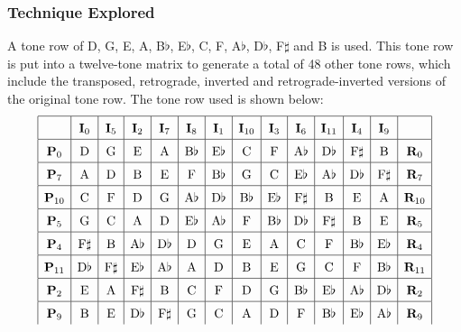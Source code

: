 \documentclass{article}
\begin{document}
\subsubsection{Technique Explored}

A tone row of D, G, E, A, B\(\flat\), E\(\flat\), C, F, A\(\flat\), D\(\flat\), F\(\sharp\) and B is used. This tone row is put into a twelve-tone matrix to generate a total of 48 other tone rows, which include the transposed, retrograde, inverted and retrograde-inverted versions of the original tone row. The tone row used is shown below:
\\
\[\def\arraystretch{1.5}
\begin{array}{|c|c|c|c|c|c|c|c|c|c|c|c|c|c|}
\hline
&\mathbf{I}_0&\mathbf{I}_5&\mathbf{I}_2&\mathbf{I}_7&\mathbf{I}_8&\mathbf{I}_1&\mathbf{I}_{10}&\mathbf{I}_3&\mathbf{I}_6&\mathbf{I}_{11}&\mathbf{I}_4&\mathbf{I}_9&\\
\hline
\mathbf{P}_0&\mathrm{D}&\mathrm{G}&\mathrm{E}&\mathrm{A}&\mathrm{B}\flat&\mathrm{E}\flat&\mathrm{C}&\mathrm{F}&\mathrm{A}\flat&\mathrm{D}\flat&\mathrm{F}\sharp&\mathrm{B}&\mathbf{R}_0\\
\hline
\mathbf{P}_7&\mathrm{A}&\mathrm{D}&\mathrm{B}&\mathrm{E}&\mathrm{F}&\mathrm{B}\flat&\mathrm{G}&\mathrm{C}&\mathrm{E}\flat&\mathrm{A}\flat&\mathrm{D}\flat&\mathrm{F}\sharp&\mathbf{R}_7\\
\hline
\mathbf{P}_{10}&\mathrm{C}&\mathrm{F}&\mathrm{D}&\mathrm{G}&\mathrm{A}\flat&\mathrm{D}\flat&\mathrm{B}\flat&\mathrm{E}\flat&\mathrm{F}\sharp&\mathrm{B}&\mathrm{E}&\mathrm{A}&\mathbf{R}_{10}\\
\hline
\mathbf{P}_5&\mathrm{G}&\mathrm{C}&\mathrm{A}&\mathrm{D}&\mathrm{E}\flat&\mathrm{A}\flat&\mathrm{F}&\mathrm{B}\flat&\mathrm{D}\flat&\mathrm{F}\sharp&\mathrm{B}&\mathrm{E}&\mathbf{R}_5\\
\hline
\mathbf{P}_4&\mathrm{F}\sharp&\mathrm{B}&\mathrm{A}\flat&\mathrm{D}\flat&\mathrm{D}&\mathrm{G}&\mathrm{E}&\mathrm{A}&\mathrm{C}&\mathrm{F}&\mathrm{B}\flat&\mathrm{E}\flat&\mathbf{R}_4\\
\hline
\mathbf{P}_{11}&\mathrm{D}\flat&\mathrm{F}\sharp&\mathrm{E}\flat&\mathrm{A}\flat&\mathrm{A}&\mathrm{D}&\mathrm{B}&\mathrm{E}&\mathrm{G}&\mathrm{C}&\mathrm{F}&\mathrm{B}\flat&\mathbf{R}_{11}\\
\hline
\mathbf{P}_2&\mathrm{E}&\mathrm{A}&\mathrm{F}\sharp&\mathrm{B}&\mathrm{C}&\mathrm{F}&\mathrm{D}&\mathrm{G}&\mathrm{B}\flat&\mathrm{E}\flat&\mathrm{A}\flat&\mathrm{D}\flat&\mathbf{R}_2\\
\hline
\mathbf{P}_9&\mathrm{B}&\mathrm{E}&\mathrm{D}\flat&\mathrm{F}\sharp&\mathrm{G}&\mathrm{C}&\mathrm{A}&\mathrm{D}&\mathrm{F}&\mathrm{B}\flat&\mathrm{E}\flat&\mathrm{A}\flat&\mathbf{R}_9\\

\end{array}\]
\end{document}
